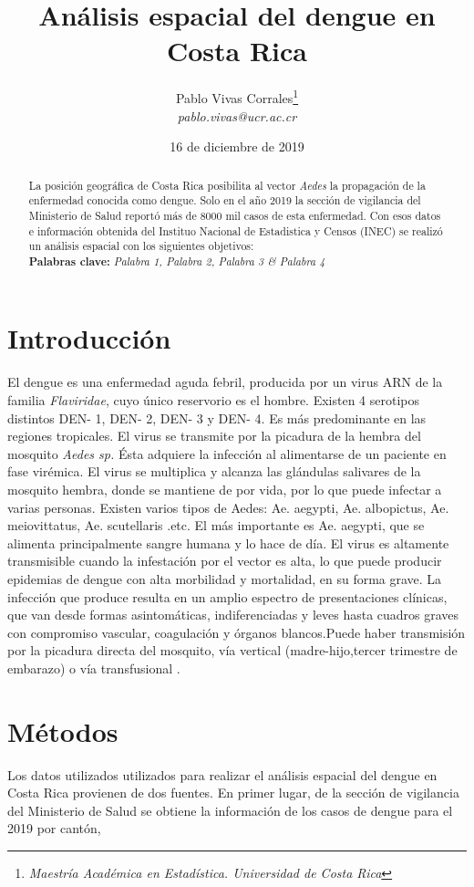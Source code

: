 \documentclass[12pt,a4paper]{article}
\author{Pablo Vivas Corrales\footnote{\textit{Maestría Académica en Estadística. Universidad de Costa Rica}}\\\textit{pablo.vivas@ucr.ac.cr}}
\title{Análisis espacial del dengue en Costa Rica}
\date{16 de diciembre de 2019}
\begin{document}
\maketitle
\begin{abstract}
\noindent
La posición geográfica de Costa Rica posibilita al vector \textit{Aedes} la propagación de la enfermedad conocida como dengue. Solo en el año 2019 la sección de vigilancia del Ministerio de Salud reportó más de 8000 mil casos de esta enfermedad. Con esos datos e información obtenida del Instituo Nacional de Estadistica y Censos (INEC) se realizó un análisis espacial con los siguientes objetivos: \\
\textbf{Palabras clave:} \textit{Palabra 1, Palabra 2, Palabra 3 \& Palabra 4} 
\end{abstract}
\section{Introducción}

El dengue es una enfermedad aguda febril, producida por un virus ARN de la familia \textit{Flaviridae}, cuyo único reservorio es el hombre. Existen 4 serotipos distintos DEN- 1, DEN- 2, DEN- 3 y DEN- 4. Es más predominante en las regiones tropicales. El virus se transmite por la picadura de la hembra del mosquito \textit{Aedes sp.} Ésta adquiere la infección al alimentarse de un paciente en fase virémica. El virus se multiplica y alcanza las glándulas salivares de la mosquito hembra, donde se mantiene de por vida, por lo que puede infectar a varias personas. Existen varios tipos de Aedes: Ae. aegypti, Ae. albopictus, Ae. meiovittatus, Ae. scutellaris .etc. El más importante es Ae. aegypti, que se alimenta principalmente sangre humana y lo hace de día. El virus es altamente transmisible cuando la infestación por el vector es alta, lo que puede producir epidemias de dengue con alta morbilidad y mortalidad, en su forma grave. La infección que produce resulta en un amplio espectro de presentaciones clínicas, que van desde formas asintomáticas, indiferenciadas y leves hasta cuadros graves con compromiso vascular, coagulación y órganos blancos.Puede haber transmisión por la picadura directa del mosquito, vía vertical (madre-hijo,tercer trimestre de embarazo) o vía transfusional \cite{CajaCostarricensedelSeguroSocial2013}.
\section{Métodos}

Los datos utilizados utilizados para realizar el análisis espacial del dengue en Costa Rica provienen de dos fuentes. En primer lugar, de la sección de vigilancia del Ministerio de Salud se obtiene la información de los casos de dengue para el 2019 por cantón,  
\end{document}
